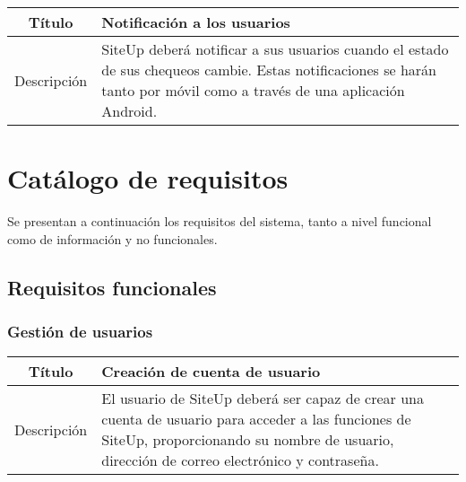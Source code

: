 \begin{center}
  
  \begin{tabularx}{\textwidth}{|c|X|}
    \hline
    Título & Notificación a los usuarios \\

    \hline

    Descripción & SiteUp deberá notificar a sus usuarios cuando el estado de sus
    chequeos cambie. Estas notificaciones se harán tanto por móvil como a través
    de una aplicación Android. \\

    \hline
  \end{tabularx}
\end{center}

\section{Catálogo de requisitos}

Se presentan a continuación los requisitos del sistema, tanto a nivel funcional como de información y no funcionales.

\subsection{Requisitos funcionales}

\subsubsection{Gestión de usuarios}

\begin{center}
  
  \begin{tabularx}{\textwidth}{|c|X|}
    \hline
    Título & Creación de cuenta de usuario \\

    \hline

    Descripción & El usuario de SiteUp deberá ser capaz de crear una cuenta de
    usuario para acceder a las funciones de SiteUp, proporcionando su nombre de
    usuario, dirección de correo electrónico y contraseña.\\

    \hline
  \end{tabularx}
\end{center}

